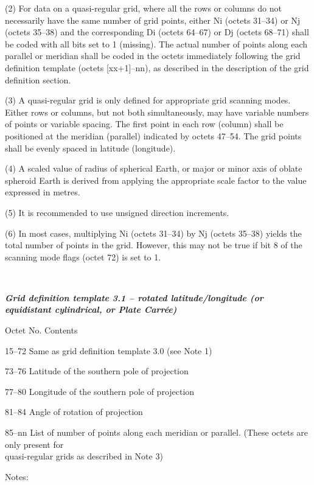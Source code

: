 (2) For data on a quasi-regular grid, where all the rows or columns do not necessarily have the same number of grid points, either Ni (octets 31--34) or Nj (octets 35--38) and the corresponding Di (octets 64--67) or Dj (octets 68--71) shall be coded with all bits set to 1 (missing). The actual number of points along each parallel or meridian shall be coded in the octets immediately following the grid definition template (octets {[}xx+1{]}--nn), as described in the description of the grid definition section.

(3) A quasi-regular grid is only defined for appropriate grid scanning modes. Either rows or columns, but not both simultaneously, may have variable numbers of points or variable spacing. The first point in each row (column) shall be positioned at the meridian (parallel) indicated by octets 47--54. The grid points shall be evenly spaced in latitude (longitude).

(4) A scaled value of radius of spherical Earth, or major or minor axis of oblate spheroid Earth is derived from applying the appropriate scale factor to the value expressed in metres.

(5) It is recommended to use unsigned direction increments.

(6) In most cases, multiplying Ni (octets 31--34) by Nj (octets 35--38) yields the total number of points in the grid. However, this may not be true if bit 8 of the scanning mode flags (octet 72) is set to 1.

\emph{\textbf{\\
}}

\emph{\textbf{Grid definition template 3.1 -- rotated latitude/longitude (or equidistant cylindrical, or Plate Carrée)}}

Octet No. Contents

15--72 Same as grid definition template 3.0 (see Note 1)

73--76 Latitude of the southern pole of projection

77--80 Longitude of the southern pole of projection

81--84 Angle of rotation of projection

85--nn List of number of points along each meridian or parallel. (These octets are only present for\\
quasi-regular grids as described in Note 3)

Notes:

